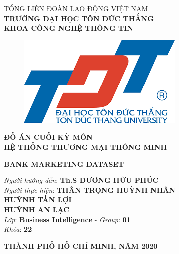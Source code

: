 \documentclass{report}
\begin{document}

\begin{center}
	\fontsize{14}{20}\selectfont
	\textsc{TỔNG LIÊN ĐOÀN LAO ĐỘNG VIỆT NAM\\ 
		\textbf{TRƯỜNG ĐẠI HỌC TÔN ĐỨC THẮNG\\} 
		\textbf{KHOA CÔNG NGHỆ THÔNG TIN}}
	
	\vspace{0.08cm}
	\begin{figure}[htp]
		\begin{center}
			\includegraphics[scale=0.5]{image/logo tdt.png}
		\end{center}
	\end{figure}
	
	\fontsize{15}{20}\selectfont\textbf{ĐỒ ÁN CUỐI KỲ MÔN\\HỆ THỐNG THƯƠNG MẠI THÔNG MINH\\}
	
	\vspace{2cm}
	\fontsize{24}{20}\selectfont\textbf{BANK MARKETING DATASET}
\end{center}
\vspace{1.5cm}

\begin{flushright}
	\fontsize{14}{20}\selectfont
	\textit{Người hướng dẫn}: \textbf{Th.S DƯƠNG HỮU PHÚC}\\
	\textit{Người thực hiện}:
	\textbf{THÂN TRỌNG HUỲNH NHÂN}\\
	\textbf{HUỲNH TẤN LỢI}\\
	\textbf{HUỲNH AN LẠC}\\
	\textit{Lớp}: \textbf{Business Intelligence} - \textit{Group}: \textbf{01}\\
	\textit{Khóa}: \textbf{22}\\
\end{flushright}
\vspace{2cm}
\begin{center}
	\fontsize{14}{20}\selectfont
	\textbf{THÀNH PHỐ HỒ CHÍ MINH, NĂM 2020}
\end{center}
\pagebreak
\end{document}
